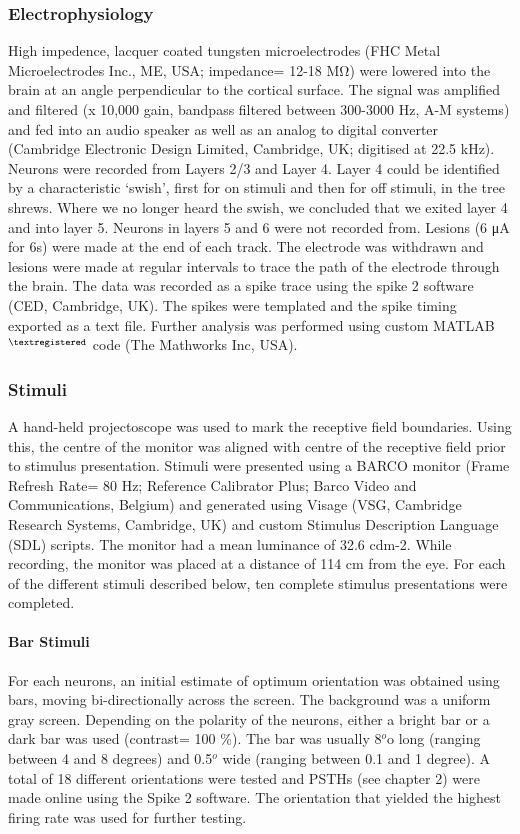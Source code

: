 	\subsubsection{Electrophysiology}
High impedence, lacquer coated tungsten microelectrodes (FHC Metal Microelectrodes Inc., ME, USA; impedance= 12-18 MΩ) were lowered into the brain at an angle perpendicular to the cortical surface. The signal was amplified and filtered (x 10,000 gain, bandpass filtered between 300-3000 Hz, A-M systems) and fed into an audio speaker as well as an analog to digital converter (Cambridge Electronic Design Limited, Cambridge, UK; digitised at 22.5 kHz). Neurons were recorded from Layers 2/3 and Layer 4. Layer 4 could be identified by a characteristic ‘swish’, first for on stimuli and then for off stimuli, in the tree shrews. Where we no longer heard the swish, we concluded that we exited layer 4 and into layer 5. Neurons in layers 5 and 6 were not recorded from. Lesions (6 μA for 6s) were made at the end of each track. The electrode was withdrawn and lesions were made at regular intervals to trace the path of the electrode through the brain. The data was recorded as a spike trace using the spike 2 software (CED, Cambridge, UK). The spikes were templated and the spike timing exported as a text file. Further analysis was performed using custom MATLAB$^{\textregistered\\}$ code (The Mathworks Inc, USA).
\subsubsection{Stimuli}
A hand-held projectoscope was used to mark the receptive field boundaries. Using this, the centre of the monitor was aligned with centre of the receptive field prior to stimulus presentation. Stimuli were presented using a BARCO monitor (Frame Refresh Rate= 80 Hz; Reference Calibrator Plus; Barco Video and Communications, Belgium) and generated using Visage (VSG, Cambridge Research Systems, Cambridge, UK) and custom Stimulus Description Language (SDL) scripts. The monitor had a mean luminance of 32.6 cdm-2. While recording, the monitor was placed at a distance of 114 cm from the eye. For each of the different stimuli described below, ten complete stimulus presentations were completed.
\paragraph{Bar Stimuli}
For each neurons, an initial estimate of optimum orientation was obtained using bars, moving bi-directionally across the screen. The background was a uniform gray screen. Depending on the polarity of the neurons, either a bright bar or a dark bar was used (contrast= 100 \%). The bar was usually 8$^o$o long (ranging between 4 and 8 degrees) and 0.5$^o$ wide (ranging between 0.1 and 1 degree). A total of 18 different orientations were tested and PSTHs (see chapter 2) were made online using the Spike 2 software. The orientation that yielded the highest firing rate was used for further testing.

